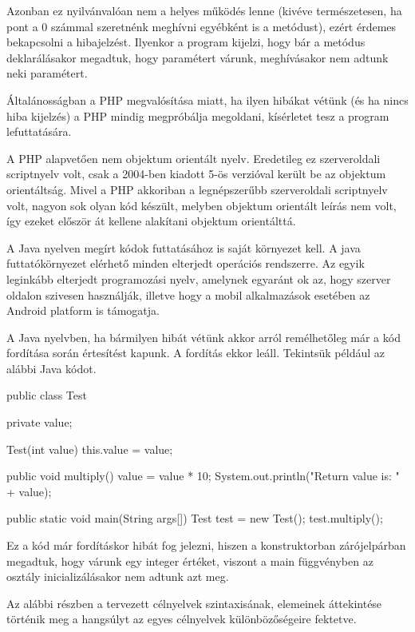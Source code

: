 Azonban ez nyilvánvalóan nem a helyes működés lenne (kivéve természetesen, ha pont a 0 számmal szeretnénk meghívni egyébként is a metódust), ezért érdemes bekapcsolni a hibajelzést. Ilyenkor a program kijelzi, hogy bár a metódus deklarálásakor megadtuk, hogy paramétert várunk, meghívásakor nem adtunk neki paramétert.

Általánosságban a PHP megvalósítása miatt, ha ilyen hibákat vétünk (és ha nincs hiba kijelzés) a PHP mindig megpróbálja megoldani, kísérletet tesz a program lefuttatására.

A PHP alapvetően nem objektum orientált nyelv. Eredetileg ez szerveroldali scriptnyelv volt, csak a 2004-ben kiadott 5-ös verzióval került be az objektum orientáltság. Mivel a PHP akkoriban a legnépszerűbb szerveroldali scriptnyelv volt, nagyon sok olyan kód készült, melyben objektum orientált leírás nem volt, így ezeket először át kellene alakítani objektum orientálttá.


A Java nyelven megírt kódok futtatásához is saját környezet kell. A java futtatókörnyezet elérhető minden elterjedt operációs rendszerre. Az egyik leginkább elterjedt programozási nyelv, amelynek egyaránt ok az, hogy szerver oldalon szivesen használják, illetve hogy a mobil alkalmazások esetében az Android platform is támogatja.

A Java nyelvben, ha bármilyen hibát vétünk akkor arról remélhetőleg már a kód fordítása során értesítést kapunk. A fordítás ekkor leáll. Tekintsük például az alábbi Java kódot.
\begin{java}
public class Test {
    private value;
    
    Test(int value) {
        this.value = value;
    }

   public void multiply() {
      value = value * 10;
      System.out.println("Return value is: " + value);
   }

   public static void main(String args[]) {
      Test test = new Test();
      test.multiply();
   }
}
\end{java}

Ez a kód már fordításkor hibát fog jelezni, hiszen a konstruktorban zárójelpárban megadtuk, hogy várunk egy integer értéket, viszont a main függvényben az osztály inicializálásakor nem adtunk azt meg. 


Az alábbi részben a tervezett célnyelvek szintaxisának, elemeinek áttekintése történik meg a hangsúlyt az egyes célnyelvek különbözőségeire fektetve.


